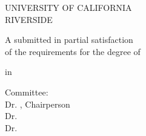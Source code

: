 \begin{titlepage}
    \begin{center}
    \null
        \vspace{0.2in} %
    
        UNIVERSITY OF CALIFORNIA \\
        RIVERSIDE
        
        \vfill
        
        \Title 
        
        \vspace{0.5in}
        
        A \DocumentType{} submitted in partial satisfaction\\
        of the requirements for the degree of
        
        
        \vspace{0.5in}
        
        \Degree
        
        \vspace{0.5in}
        in 
        \vspace{0.5in}
        
        \FieldofStudy
        
        \vspace{0.5in}
        
        \Author
        
        \vspace{0.5in}
        
        \ConferralDate 

    \end{center}
        \vspace{1.0in}
        \DocumentType{} Committee: \\
            \-\hspace{20pt} Dr. {\CommChair}, Chairperson \\
            \-\hspace{20pt} Dr. {\CommMembtwo} \\
            \-\hspace{20pt} Dr. {\CommMembthree} \\
\end{titlepage}